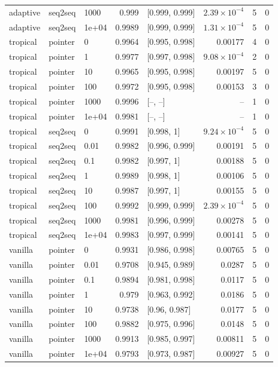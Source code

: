 \documentclass[10pt]{article}
\begin{document}
{\begin{longtable}{lllrlrrr}
adaptive & seq2seq & 1000 & 0.999 & [0.999, 0.999] & $2.39\times10^{-4}$ & 5 & 0\\
adaptive & seq2seq & 1e+04 & 0.9989 & [0.999, 0.999] & $1.31\times10^{-4}$ & 5 & 0\\
tropical & pointer & 0 & 0.9964 & [0.995, 0.998] & 0.00177 & 4 & 0\\
tropical & pointer & 1 & 0.9977 & [0.997, 0.998] & $9.08\times10^{-4}$ & 2 & 0\\
tropical & pointer & 10 & 0.9965 & [0.995, 0.998] & 0.00197 & 5 & 0\\
tropical & pointer & 100 & 0.9972 & [0.995, 0.998] & 0.00153 & 3 & 0\\
tropical & pointer & 1000 & 0.9996 & [--, --] & -- & 1 & 0\\
tropical & pointer & 1e+04 & 0.9981 & [--, --] & -- & 1 & 0\\
tropical & seq2seq & 0 & 0.9991 & [0.998, 1] & $9.24\times10^{-4}$ & 5 & 0\\
tropical & seq2seq & 0.01 & 0.9982 & [0.996, 0.999] & 0.00191 & 5 & 0\\
tropical & seq2seq & 0.1 & 0.9982 & [0.997, 1] & 0.00188 & 5 & 0\\
tropical & seq2seq & 1 & 0.9989 & [0.998, 1] & 0.00106 & 5 & 0\\
tropical & seq2seq & 10 & 0.9987 & [0.997, 1] & 0.00155 & 5 & 0\\
tropical & seq2seq & 100 & 0.9992 & [0.999, 0.999] & $2.39\times10^{-4}$ & 5 & 0\\
tropical & seq2seq & 1000 & 0.9981 & [0.996, 0.999] & 0.00278 & 5 & 0\\
tropical & seq2seq & 1e+04 & 0.9983 & [0.997, 0.999] & 0.00141 & 5 & 0\\
vanilla & pointer & 0 & 0.9931 & [0.986, 0.998] & 0.00765 & 5 & 0\\
vanilla & pointer & 0.01 & 0.9708 & [0.945, 0.989] & 0.0287 & 5 & 0\\
vanilla & pointer & 0.1 & 0.9894 & [0.981, 0.998] & 0.0117 & 5 & 0\\
vanilla & pointer & 1 & 0.979 & [0.963, 0.992] & 0.0186 & 5 & 0\\
vanilla & pointer & 10 & 0.9738 & [0.96, 0.987] & 0.0177 & 5 & 0\\
vanilla & pointer & 100 & 0.9882 & [0.975, 0.996] & 0.0148 & 5 & 0\\
vanilla & pointer & 1000 & 0.9913 & [0.985, 0.997] & 0.00811 & 5 & 0\\
vanilla & pointer & 1e+04 & 0.9793 & [0.973, 0.987] & 0.00927 & 5 & 0\\

\end{longtable}}
\end{document}
